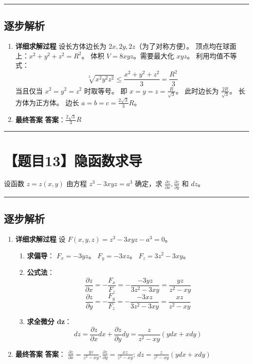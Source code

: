 \documentclass[UTF8]{ctexart}
\newenvironment{redenv}{\color{red}}{}
\newenvironment{detailedanalysis}{%
    \color{red}
    \begin{enumerate}[label=\textbf{第\arabic*步：}, leftmargin=*, align=left, itemsep=1.5ex]
}{%
    \end{enumerate}
}
\newcommand{\problemrule}{\noindent\rule{\textwidth}{1.5pt}\vspace{-0.8em}}
\newcommand{\analysisrule}{\noindent\rule{\textwidth}{0.8pt}\vspace{-0.8em}}
\begin{document}
\begin{redenv}
\analysisrule
\subsection*{逐步解析}

\begin{detailedanalysis}
\item \textbf{详细求解过程}
设长方体边长为 $2x, 2y, 2z$（为了对称方便）。
顶点均在球面上：$x^2 + y^2 + z^2 = R^2$。
体积 $V = 8xyz$。需要最大化 $xyz$。
利用均值不等式：
$$ \sqrt[3]{x^2 y^2 z^2} \le \frac{x^2+y^2+z^2}{3} = \frac{R^2}{3} $$
当且仅当 $x^2 = y^2 = z^2$ 时取等号。
即 $x=y=z = \frac{R}{\sqrt{3}}$。
此时边长为 $\frac{2R}{\sqrt{3}}$。
长方体为正方体。
边长 $a = b = c = \frac{2\sqrt{3}}{3}R$。

\item \textbf{最终答案}
\textbf{答案}：$ \frac{2\sqrt{3}}{3}R $
\end{detailedanalysis}
\end{redenv}

\problemrule
\section*{【题目13】隐函数求导}
设函数 $ z = z(x, y) $ 由方程 $ z^{3} - 3xyz = a^{3} $ 确定，求 $ \frac{\partial z}{\partial x}, \frac{\partial z}{\partial y} $ 和 $dz$。

\begin{redenv}
\analysisrule
\subsection*{逐步解析}

\begin{detailedanalysis}
\item \textbf{详细求解过程}
设 $F(x,y,z) = z^3 - 3xyz - a^3 = 0$。
\begin{enumerate}[label=(\arabic*)]
\item \textbf{求偏导}：
$F_x = -3yz$。
$F_y = -3xz$。
$F_z = 3z^2 - 3xy$。
\item \textbf{公式法}：
$$ \frac{\partial z}{\partial x} = -\frac{F_x}{F_z} = -\frac{-3yz}{3z^2 - 3xy} = \frac{yz}{z^2-xy} $$
$$ \frac{\partial z}{\partial y} = -\frac{F_y}{F_z} = -\frac{-3xz}{3z^2 - 3xy} = \frac{xz}{z^2-xy} $$
\item \textbf{求全微分 dz}：
$$ dz = \frac{\partial z}{\partial x} dx + \frac{\partial z}{\partial y} dy = \frac{z}{z^2-xy}(y dx + x dy) $$
\end{enumerate}

\item \textbf{最终答案}
\textbf{答案}：
$ \frac{\partial z}{\partial x} = \frac{yz}{z^2-xy}, \frac{\partial z}{\partial y} = \frac{xz}{z^2-xy} $;
$ dz = \frac{z}{z^2-xy}(y dx + x dy) $
\end{detailedanalysis}
\end{redenv}
\end{document}
